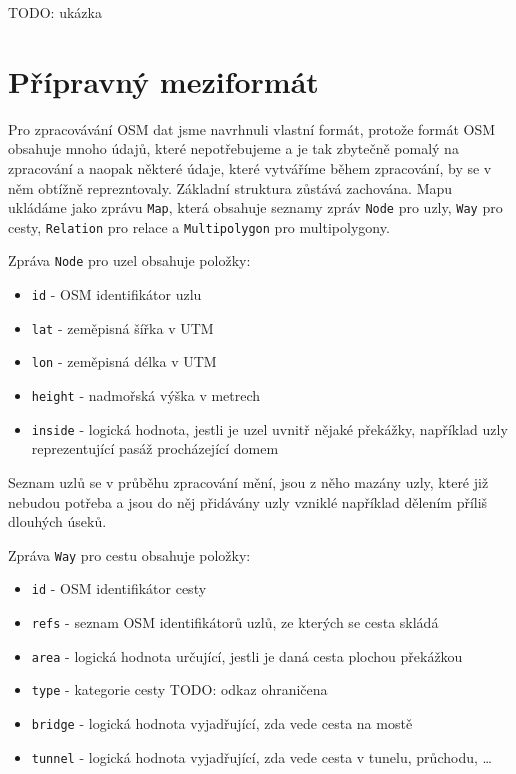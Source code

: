 TODO: ukázka

\section{Přípravný meziformát}
Pro zpracovávání OSM dat jsme navrhnuli vlastní formát, protože formát OSM
obsahuje mnoho údajů, které nepotřebujeme a je tak zbytečně pomalý na zpracování
a naopak některé údaje, které vytváříme během zpracování, by se v něm obtížně
reprezntovaly. Základní struktura zůstává zachována. Mapu ukládáme jako zprávu
\verb|Map|, která obsahuje seznamy zpráv \verb|Node| pro uzly, \verb|Way| pro
cesty, \verb|Relation| pro relace a \verb|Multipolygon| pro multipolygony.

Zpráva \verb|Node| pro uzel obsahuje položky:
\begin{itemize}
	\item \verb|id| - OSM identifikátor uzlu
	\item \verb|lat| - zeměpisná šířka v UTM
	\item \verb|lon| - zeměpisná délka v UTM
	\item \verb|height| - nadmořská výška v metrech
	\item \verb|inside| - logická hodnota, jestli je uzel uvnitř nějaké
	překážky, například uzly reprezentující pasáž procházející domem
\end{itemize}
Seznam uzlů se v průběhu zpracování mění, jsou z něho mazány uzly, které již
nebudou potřeba a jsou do něj přidávány uzly vzniklé například dělením příliš
dlouhých úseků.

Zpráva \verb|Way| pro cestu obsahuje položky:
\begin{itemize}
	\item \verb|id| - OSM identifikátor cesty
	\item \verb|refs| - seznam OSM identifikátorů uzlů, ze kterých se cesta
	skládá
	\item \verb|area| - logická hodnota určující, jestli je daná cesta
	plochou
	překážkou
	\item \verb|type| - kategorie cesty TODO: odkaz
	ohraničena
	\item \verb|bridge| - logická hodnota vyjadřující, zda vede cesta na mostě
	\item \verb|tunnel| - logická hodnota vyjadřující, zda vede cesta v
	tunelu, průchodu, \dots
\end{itemize}

